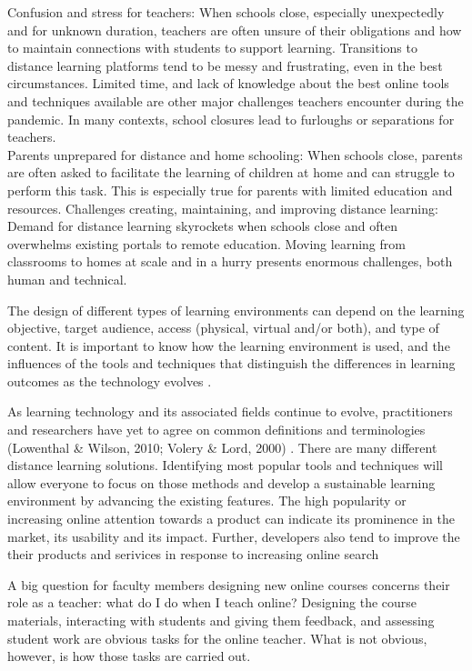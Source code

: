 \documentclass[11pt,a4paper,]{article}
\begin{document}
Confusion and stress for teachers: When schools close, especially unexpectedly and for unknown duration, teachers are often unsure of their obligations and how to maintain connections with students to support learning. Transitions to distance learning platforms tend to be messy and frustrating, even in the best circumstances. Limited time, and lack of knowledge about the best online tools and techniques available are other major challenges teachers encounter during the pandemic. In many contexts, school closures lead to furloughs or separations for teachers.\\
Parents unprepared for distance and home schooling: When schools close, parents are often asked to facilitate the learning of children at home and can struggle to perform this task. This is especially true for parents with limited education and resources.
Challenges creating, maintaining, and improving distance learning: Demand for distance learning skyrockets when schools close and often overwhelms existing portals to remote education. Moving learning from classrooms to homes at scale and in a hurry presents enormous challenges, both human and technical.

The design of different types of learning environments can depend on the learning objective, target audience, access (physical, virtual and/or both), and type of content. It is important to know how the learning environment is used, and the influences of the tools and techniques that distinguish the differences in learning outcomes as the technology evolves \autocite{moore2011learning}.

As learning technology and its associated fields continue to evolve, practitioners and researchers have yet to agree on common definitions and terminologies (Lowenthal \& Wilson, 2010; Volery \& Lord, 2000) \autocite{moore2011learning}. There are many different distance learning solutions. Identifying most popular tools and techniques will allow everyone to focus on those methods and develop a sustainable learning environment by advancing the existing features. The high popularity or increasing online attention towards a product can indicate its prominence in the market, its usability and its impact. Further, developers also tend to improve the their products and serivices in response to increasing online search \autocite{willis2020using}

A big question for faculty members designing new online courses concerns their role as a teacher: what do I do when I teach online? Designing the course materials, interacting with students and giving them feedback, and assessing student work are obvious tasks for the online teacher. What is not
obvious, however, is how those tasks are carried out.
\end{document}
